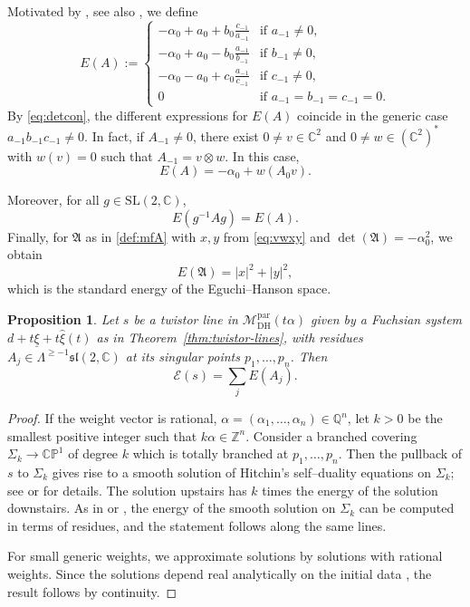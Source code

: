 \documentclass[12pt,a4paper]{amsart}
\newtheorem{proposition}[theorem]{Proposition}
\theoremstyle{definition}
\theoremstyle{remark}
\newcommand{\C}{\mathbb C}
\newcommand{\Z}{\mathbb Z}
\newcommand{\CP}{\mathbb{CP}}
\begin{document}
Motivated by \cite[(110)]{HellerHellerTraizet2025}, see also \cite[Section~5]{BHS},
we define
\[E(A):=
\begin{cases}
-\alpha_0+a_{0}+b_{0}\tfrac{c_{-1}}{a_{-1}} & \text{if } a_{-1}\neq0,\\[0.4em]
-\alpha_0+a_{0}-b_{0}\tfrac{a_{-1}}{b_{-1}} & \text{if } b_{-1}\neq0,\\[0.4em]
-\alpha_0-a_{0}+c_{0}\tfrac{a_{-1}}{c_{-1}} & \text{if } c_{-1}\neq0,\\[0.4em]
0 & \text{if } a_{-1}=b_{-1}=c_{-1}=0.
\end{cases}
\]
By \eqref{eq:detcon}, the different expressions for $E(A)$ coincide in the generic
case $a_{-1}b_{-1}c_{-1}\neq0$. In fact,
if $A_{-1}\neq0$, there exist $0\neq v\in\C^2$ and $0\neq w\in(\C^2)^*$ with $w(v)=0$ such
that $A_{-1}=v\otimes w$.
In this case,
\[
E(A)=-\alpha_0+w(A_0v).
\]

Moreover, for all $g\in\mathrm{SL}(2,\C)$,
\[
E(g^{-1}Ag)=E(A).
\]
Finally, for $\mathfrak A$ as in \eqref{def:mfA} with $x,y$ from \eqref{eq:vwxy} and $\det(\mathfrak A)=-\alpha_0^2$,
we obtain
\begin{equation}\label{eq:Et0}
E(\mathfrak A)=|x|^2+|y|^2,
\end{equation}
which is the standard energy of the Eguchi--Hanson space.


\begin{proposition}\label{pro:energyhitchin}
Let $s$ be a twistor line in $\mathcal M_{\mathrm{DH}}^{\mathrm{par}}(t\alpha)$
 given by a Fuchsian system
$d+t\underline \xi+t\hat\xi(t)$ as in Theorem~\ref{thm:twistor-lines}, with residues
$A_j\in\Lambda^{\geq-1}\mathfrak{sl}(2,\C)$ at its singular points
$p_1,\dots,p_n$.
Then
\[
\mathcal E(s)=\sum_j E(A_j).
\]
\end{proposition}

\begin{proof}
If the weight vector is rational,
$\alpha=(\alpha_1,\dots,\alpha_n)\in\mathbb Q^n$, let $k>0$ be the smallest positive
integer such that $k\alpha\in\Z^n$.
Consider a branched covering $\Sigma_k\to\CP^1$ of degree $k$ which is totally branched
at $p_1,\dots,p_n$.
Then the pullback of $s$ to $\Sigma_k$ gives rise to a smooth solution of Hitchin's
self--duality equations on $\Sigma_k$; see \cite{Nas} or
\cite[Section~3.2.1]{HellerHellerTraizet2025} for details.
The solution upstairs has $k$ times the energy of the solution downstairs.
As in \cite[Section~6.4]{HellerHellerTraizet2025} or \cite[Corollary~18]{HHT1}, the
energy of the smooth solution on $\Sigma_k$ can be computed in terms of residues, and
the statement follows along the same lines.

For small generic weights, we approximate solutions by solutions with rational weights.
Since the solutions depend real analytically on the initial data \cite{KiWi}, the result follows by continuity.
\end{proof}
\end{document}
